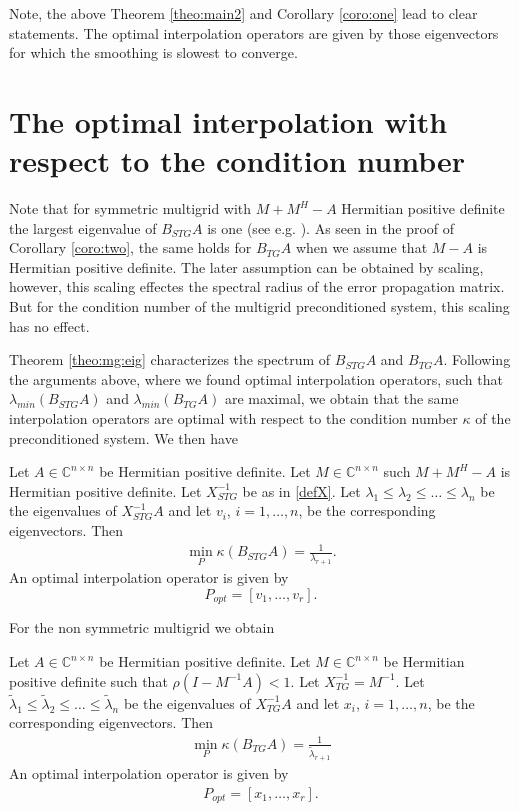 \documentclass[final]{siamltex}
\newcommand{\beqo}{\begin{eqnarray*}}
\newcommand{\beq}{\begin{eqnarray}}
\newcommand{\eeqo}{\end{eqnarray*}}
\newcommand{\eeq}{\end{eqnarray}}
\numberwithin{equation}{section}
\newcommand{\inCnn}{\in \mathbb{C}^{n \times n}}
\begin{document}
Note, the above Theorem \ref{theo:main2} and  Corollary \ref{coro:one} lead to
clear statements. The optimal interpolation operators are given by those
eigenvectors for which the smoothing is slowest to converge.







\section{The optimal interpolation with respect to the  condition number}





Note  that for symmetric multigrid with  $M + M^H - A$ Hermitian  positive
definite  the largest eigenvalue of
$B_{STG}A$ is one (see e.g. \cite{Not15}).  As seen in the proof of Corollary
\ref{coro:two}, the same holds  for  $B_{TG}A$ when we assume  that  $M - A$ is
Hermitian  positive definite. The later
assumption can be obtained  by scaling, however, this scaling effectes the
spectral radius of the
error propagation matrix. But for the condition number of the multigrid
preconditioned system, this scaling has no effect.

Theorem \ref{theo:mg:eig} characterizes the  spectrum of $B_{STG}A$ and
$B_{TG}A$. Following the arguments above, where   we found optimal
interpolation operators, such that
$\lambda_{min}(B_{STG}A)$ and $\lambda_{min}(B_{TG}A)$ are maximal, we obtain
that the same interpolation operators are optimal with respect to the condition
number $\kappa$ of the preconditioned system. We then have

 \begin{theorem}
Let  $A\inCnn$  be Hermitian positive definite. Let $ M \inCnn$ such $M + M^H -
A$ is Hermitian positive definite.
Let $X_{STG}^{-1}$  be as in \eqref{defX}.  
 Let $
\lambda_1 \leq \lambda_2 \leq \ldots \leq  \lambda_n $
be the  eigenvalues of $X_{STG}^{-1}A$  and let $v_i$, $i = 1, \ldots, n$, be
the corresponding eigenvectors. Then
\beq
\min_P \kappa(B_{STG}A) = \frac{1}{\lambda_{r+1}}.
\eeq
An optimal interpolation operator is given by 
\[
P_{opt} = [v_{1}, \ldots , v_r].
\]
\end{theorem}
  
For the non symmetric multigrid we obtain

\begin{theorem}
Let  $A\inCnn$  be Hermitian positive definite. Let $ M \inCnn$ be Hermitian
positive definite  such that $\rho(I - M^{-1}A) < 1.$
Let $X_{TG}^{-1} =  M^{-1}$.   
 Let $
\tilde \lambda_1 \leq \tilde \lambda_2 \leq \ldots \leq  \tilde \lambda_n $
be the  eigenvalues of $X_{TG}^{-1}A$  and let $x_i$, $i = 1, \ldots, n$, be
the corresponding eigenvectors. Then
\beqo
\min_P \kappa(B_{TG}A) = \frac{1}{\tilde \lambda_{r+1}}
\eeqo
An optimal interpolation operator is given by 
\beqo
P_{opt} = [x_{1}, \ldots , x_r].
\eeqo
\end{theorem}
\end{document}
